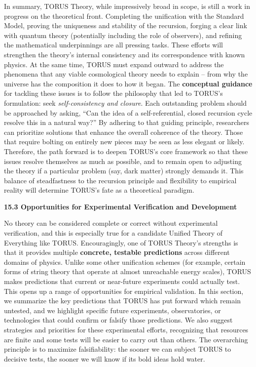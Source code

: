 \documentclass[]{article}
\begin{document}
In summary, TORUS Theory, while impressively broad in scope, is still a
work in progress on the theoretical front. Completing the unification
with the Standard Model, proving the uniqueness and stability of the
recursion, forging a clear link with quantum theory (potentially
including the role of observers), and refining the mathematical
underpinnings are all pressing tasks. These efforts will strengthen the
theory's internal consistency and its correspondence with known physics.
At the same time, TORUS must expand outward to address the phenomena
that any viable cosmological theory needs to explain -- from why the
universe has the composition it does to how it began. The
\textbf{conceptual guidance} for tackling these issues is to follow the
philosophy that led to TORUS's formulation: seek \emph{self-consistency
and closure}. Each outstanding problem should be approached by asking,
``Can the idea of a self-referential, closed recursion cycle resolve
this in a natural way?'' By adhering to that guiding principle,
researchers can prioritize solutions that enhance the overall coherence
of the theory. Those that require bolting on entirely new pieces may be
seen as less elegant or likely. Therefore, the path forward is to deepen
TORUS's core framework so that these issues resolve themselves as much
as possible, and to remain open to adjusting the theory if a particular
problem (say, dark matter) strongly demands it. This balance of
steadfastness to the recursion principle and flexibility to empirical
reality will determine TORUS's fate as a theoretical paradigm.

\textbf{15.3 Opportunities for Experimental Verification and
Development}

No theory can be considered complete or correct without experimental
verification, and this is especially true for a candidate Unified Theory
of Everything like TORUS. Encouragingly, one of TORUS Theory's strengths
is that it provides multiple \textbf{concrete, testable predictions}
across different domains of physics. Unlike some other unification
schemes (for example, certain forms of string theory that operate at
almost unreachable energy scales), TORUS makes predictions that current
or near-future experiments could actually test​. This opens up a range
of opportunities for empirical validation. In this section, we summarize
the key predictions that TORUS has put forward which remain untested,
and we highlight specific future experiments, observatories, or
technologies that could confirm or falsify those predictions. We also
suggest strategies and priorities for these experimental efforts,
recognizing that resources are finite and some tests will be easier to
carry out than others. The overarching principle is to maximize
falsifiability: the sooner we can subject TORUS to decisive tests, the
sooner we will know if its bold ideas hold water.
\end{document}
